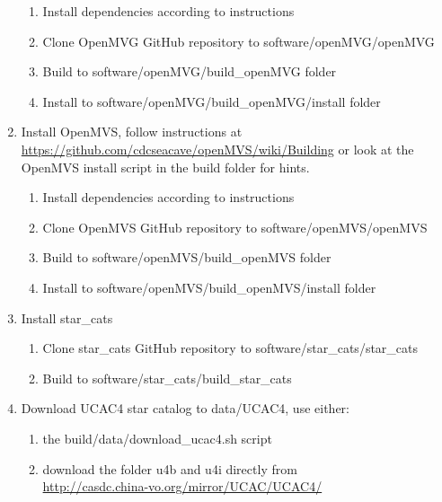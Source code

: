 \begin{enumerate}
    \begin{enumerate}
        \item Install dependencies according to instructions
        \item Clone OpenMVG GitHub repository to software/openMVG/openMVG 
        \item Build to software/openMVG/build\_openMVG folder
        \item Install to software/openMVG/build\_openMVG/install folder
    \end{enumerate}
    \item Install OpenMVS, follow instructions at \\ \url{https://github.com/cdcseacave/openMVS/wiki/Building} or look at the OpenMVS install script in the build folder for hints.
    \begin{enumerate}
        \item Install dependencies according to instructions
        \item Clone OpenMVS GitHub repository to software/openMVS/openMVS 
        \item Build to software/openMVS/build\_openMVS folder
        \item Install to software/openMVS/build\_openMVS/install folder
    \end{enumerate}
    \item Install star\_cats
    \begin{enumerate}
        \item Clone star\_cats GitHub repository to software/star\_cats/star\_cats \\ 
        \item Build to software/star\_cats/build\_star\_cats 
    \end{enumerate}
    \item Download UCAC4 star catalog to data/UCAC4, use either:
    \begin{enumerate}
        \item the build/data/download\_ucac4.sh script
        \item download the folder u4b and u4i directly from \\ \url{http://casdc.china-vo.org/mirror/UCAC/UCAC4/}
    \end{enumerate}
\end{enumerate}{}

